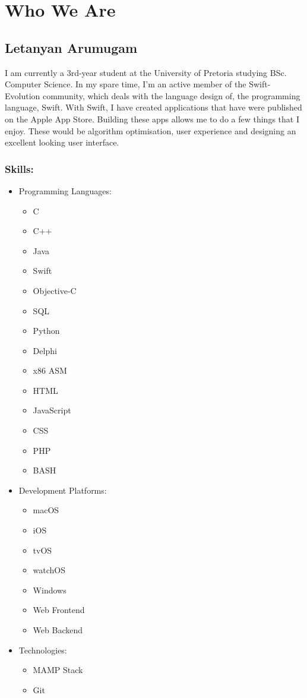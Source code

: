 \documentclass[12pt]{article}
\begin{document}
	\section*{Who We Are}
	\subsection*{Letanyan Arumugam}
I am currently a 3rd-year student at the University of Pretoria studying BSc. Computer Science. In my spare time, I'm an
active member of the Swift-Evolution community, which deals with the language design of, the programming language, Swift. With Swift, I have created applications that have were published on the Apple App Store. Building these apps allows me to do a few things that I enjoy. These would be algorithm optimisation, user experience and designing an excellent looking user interface.


	\subsubsection*{Skills:}
	\begin{itemize}
	\item Programming Languages:
	\begin{itemize}
	\item C
	\item C++
	\item Java
	\item Swift
	\item Objective-C
	\item SQL
	\item Python
	\item Delphi
	\item x86 ASM
	\item HTML
	\item JavaScript
	\item CSS
	\item PHP
	\item BASH
	\end{itemize}
	\item Development Platforms:
	\begin{itemize}
	\item macOS
	\item iOS
	\item tvOS
	\item watchOS
	\item Windows
	\item Web Frontend
	\item Web Backend
	\end{itemize}
	\item Technologies:
	\begin{itemize}
	\item MAMP Stack
	\item Git
	\end{itemize}
	\end{itemize}
	
\end{document}
